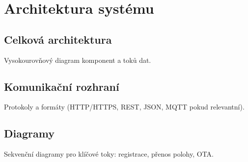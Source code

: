 \chapter{Architektura systému}
\label{chap:architektura}

\section{Celková architektura}
Vysokourovňový diagram komponent a toků dat.

\section{Komunikační rozhraní}
Protokoly a formáty (HTTP/HTTPS, REST, JSON, MQTT pokud relevantní).

\section{Diagramy}
Sekvenční diagramy pro klíčové toky: registrace, přenos polohy, OTA.
